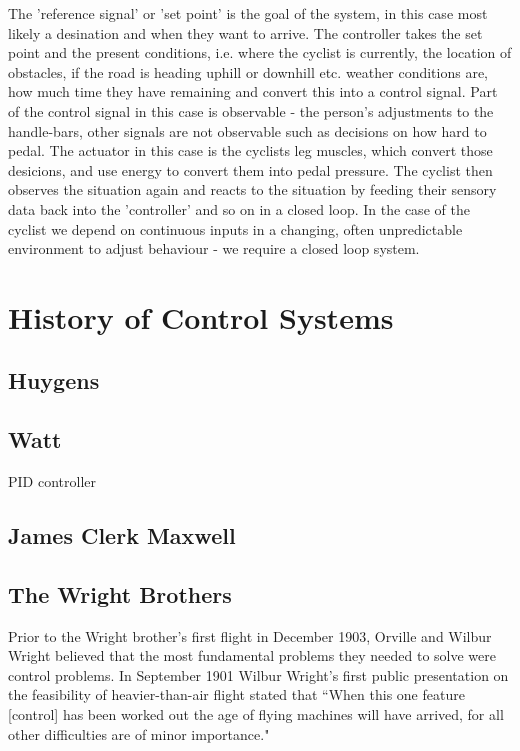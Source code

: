 The 'reference signal' or 'set point' is the goal of the system, in this case most likely a
desination and when they want to arrive. The controller takes the set point and the present
conditions, i.e. where the cyclist is currently, the location of obstacles, if the road is heading
uphill or downhill etc.  weather conditions are, how much time they have remaining and convert this
into a control signal. Part of the control signal in this case is observable - the person's
adjustments to the handle-bars, other signals are not observable such as decisions on how hard to
pedal. The actuator in this case is the cyclists leg muscles, which convert those desicions, and use
energy to convert them into pedal pressure. The cyclist then observes the situation again and reacts
to the situation by feeding their sensory data back into the 'controller' and so on in a closed
loop. In the case of the cyclist we depend on continuous inputs in a changing, often unpredictable
environment to adjust behaviour - we require a closed loop system.

\section{History of Control Systems} 

\subsection{Huygens}

\subsection{Watt}

PID controller

\subsection{James Clerk Maxwell}

\subsection{The Wright Brothers}

Prior to the Wright brother's first flight in December 1903, Orville and Wilbur Wright believed that
the most fundamental problems they needed to solve were control problems. In September 1901 Wilbur
Wright's first public presentation on the feasibility of heavier-than-air flight stated that ``When
this one feature [control] has been worked out the age of flying machines will have arrived, for all
other difficulties are of minor importance."\cite{wright1908}

